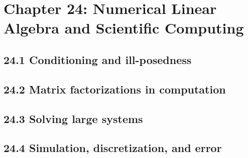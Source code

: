 \section{Chapter 24: Numerical Linear Algebra and Scientific Computing}

\subsection{24.1 Conditioning and ill-posedness}

\subsection{24.2 Matrix factorizations in computation}

\subsection{24.3 Solving large systems}

\subsection{24.4 Simulation, discretization, and error}

\clearpage
